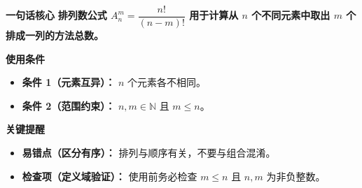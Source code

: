 \begin{summarybox}
	\textbf{\textcolor{CSummary}{一句话核心}}
	\textbf{排列数公式 $A_n^m = \dfrac{n!}{(n-m)!}$ 用于计算从 $n$ 个不同元素中取出 $m$ 个排成一列的方法总数。}

	\medskip
	\textbf{\textcolor{CSummary}{使用条件}}
	\begin{itemize}[leftmargin=*, itemsep=0.5em, topsep=0.4em]
		\item \textbf{条件 1（元素互异）：} $n$ 个元素各不相同。
		\item \textbf{条件 2（范围约束）：} $n,m \in \mathbb{N}$ 且 $m \le n$。
	\end{itemize}

	\medskip
	\textbf{\textcolor{CSummary}{关键提醒}}
	\begin{itemize}[leftmargin=*, itemsep=0.5em, topsep=0.4em]
		\item \textbf{易错点（区分有序）：} 排列与顺序有关，不要与组合混淆。
		\item \textbf{检查项（定义域验证）：} 使用前务必检查 $m\le n$ 且 $n,m$ 为非负整数。
	\end{itemize}

\end{summarybox}
